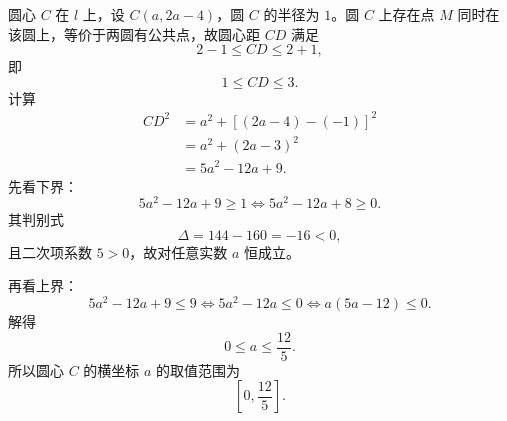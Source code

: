 \begin{answer}
圆心 $C$ 在 $l$ 上，设 $C(a,2a-4)$，圆 $C$ 的半径为 $1$。圆 $C$ 上存在点 $M$ 同时在该圆上，等价于两圆有公共点，故圆心距 $CD$ 满足
\nopagebreak[4]
\[2-1\leqslant CD\leqslant2+1,\]
即
\nopagebreak[4]
\[1\leqslant CD\leqslant3.\]
计算
\nopagebreak[4]
\[\begin{aligned}
CD^2&=a^2+\left[(2a-4)-(-1)\right]^2\\
&=a^2+(2a-3)^2\\
&=5a^2-12a+9.
\end{aligned}\]
先看下界：
\nopagebreak[4]
\[5a^2-12a+9\geqslant1
\Longleftrightarrow 5a^2-12a+8\geqslant0.\]
其判别式
\nopagebreak[4]
\[\Delta=144-160=-16<0,\]
且二次项系数 $5>0$，故对任意实数 $a$ 恒成立。

再看上界：
\nopagebreak[4]
\[5a^2-12a+9\leqslant9
\Longleftrightarrow 5a^2-12a\leqslant0
\Longleftrightarrow a(5a-12)\leqslant0.\]
解得
\nopagebreak[4]
\[0\leqslant a\leqslant\frac{12}{5}.\]
所以圆心 $C$ 的横坐标 $a$ 的取值范围为
\nopagebreak[4]
\[\left[0,\frac{12}{5}\right].\]



\end{answer}
